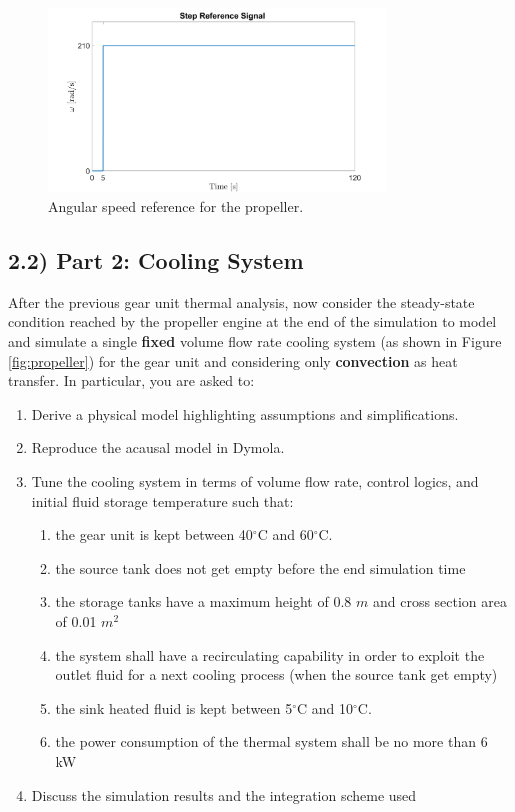 \documentclass[11pt,a4paper,oneside]{article}
\begin{document}
\begin{figure}[ht!]
    \centering
    \includegraphics[width=0.8\textwidth]{Figures/ReferenceSignal.png}
    \caption{\label{fig:refsignal} Angular speed reference for the propeller.}
\end{figure}



\subsection*{2.2) Part 2: Cooling System}
After the previous gear unit thermal analysis, now consider the steady-state condition reached by the propeller engine at the end of the simulation to model and simulate a single \textbf{fixed} volume flow rate cooling system (as shown in Figure \ref{fig:propeller}) for the gear unit and considering only \textbf{convection} as heat transfer. In particular, you are asked to:

\begin{enumerate}
    \item Derive a physical model highlighting assumptions and simplifications.
    \item Reproduce the acausal model in Dymola.
    \item Tune the cooling system in terms of volume flow rate, control logics, and initial fluid storage temperature such that:
    \begin{enumerate}
        \item the gear unit is kept between 40$^{\circ}$C and 60$^{\circ}$C.
        \item the source tank does not get empty before the end simulation time
        \item the storage tanks have a maximum height of 0.8 $m$ and cross section area of 0.01 $m^2$
        \item the system shall have a recirculating capability in order to exploit the outlet fluid for a next cooling process (when the source tank get empty)
        \item the sink heated fluid is kept between 5$^{\circ}$C and 10$^{\circ}$C.
        \item the power consumption of the thermal system shall be no more than 6 kW 
    \end{enumerate}
    \item Discuss the simulation results and the integration scheme used
\end{enumerate}
\end{document}
